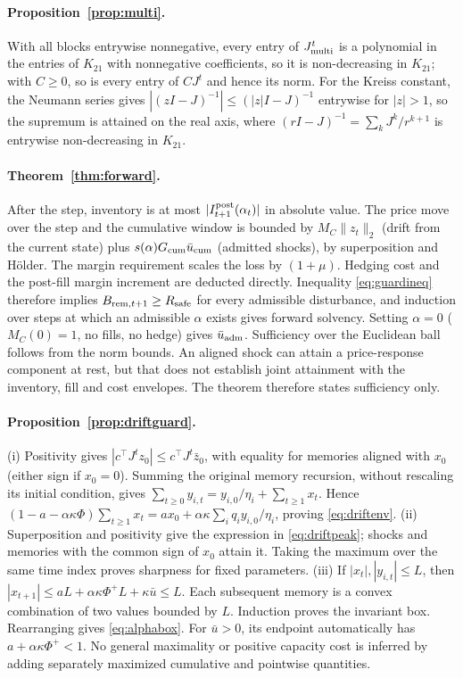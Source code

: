 \documentclass[12pt]{article}
\theoremstyle{definition}
\theoremstyle{remark}
\begin{document}
\paragraph{Proposition~\ref{prop:multi}.} With all blocks entrywise nonnegative, every entry of $J_{\rm multi}^t$ is a polynomial in the entries of $K_{21}$ with nonnegative coefficients, so it is non-decreasing in $K_{21}$; with $C\ge0$, so is every entry of $CJ^t$ and hence its norm. For the Kreiss constant, the Neumann series gives $|(zI-J)^{-1}|\le(|z|I-J)^{-1}$ entrywise for $|z|>1$, so the supremum is attained on the real axis, where $(rI-J)^{-1}=\sum_kJ^k/r^{k+1}$ is entrywise non-decreasing in $K_{21}$.

\paragraph{Theorem~\ref{thm:forward}.} After the step, inventory is at most $|I^{\rm post}_{t+1}(\alpha_t)|$ in absolute value. The price move over the step and the cumulative window is bounded by $M_C\|z_t\|_2$ (drift from the current state) plus $s(\alpha)G_{\rm cum}\bar u_{\rm cum}$ (admitted shocks), by superposition and H\"older. The margin requirement scales the loss by $(1+\mu)$. Hedging cost and the post-fill margin increment are deducted directly. Inequality \eqref{eq:guardineq} therefore implies $B_{{\rm rem},t+1}\ge R_{\rm safe}$ for every admissible disturbance, and induction over steps at which an admissible $\alpha$ exists gives forward solvency. Setting $\alpha=0$ ($M_C(0)=1$, no fills, no hedge) gives $\bar u_{\rm adm}$. Sufficiency over the Euclidean ball follows from the norm bounds. An aligned shock can attain a price-response component at rest, but that does not establish joint attainment with the inventory, fill and cost envelopes. The theorem therefore states sufficiency only.

\paragraph{Proposition~\ref{prop:driftguard}.} (i) Positivity gives $|c^\top J^tz_0|\le c^\top J^t\bar z_0$, with equality for memories aligned with $x_0$ (either sign if $x_0=0$). Summing the original memory recursion, without rescaling its initial condition, gives $\sum_{t\ge0}y_{i,t}=y_{i,0}/\eta_i+\sum_{t\ge1}x_t$. Hence $(1-a-\alpha\kappa\Phi)\sum_{t\ge1}x_t=ax_0+\alpha\kappa\sum_iq_iy_{i,0}/\eta_i$, proving \eqref{eq:driftenv}. (ii) Superposition and positivity give the expression in \eqref{eq:driftpeak}; shocks and memories with the common sign of $x_0$ attain it. Taking the maximum over the same time index proves sharpness for fixed parameters. (iii) If $|x_t|,|y_{i,t}|\le L$, then $|x_{t+1}|\le aL+\alpha\kappa\Phi^+L+\kappa\bar u\le L$. Each subsequent memory is a convex combination of two values bounded by $L$. Induction proves the invariant box. Rearranging gives \eqref{eq:alphabox}. For $\bar u>0$, its endpoint automatically has $a+\alpha\kappa\Phi^+<1$. No general maximality or positive capacity cost is inferred by adding separately maximized cumulative and pointwise quantities.
\end{document}
